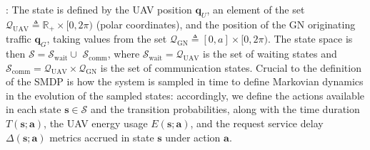 \documentclass[12pt, draftcls, onecolumn]{IEEEtran}
\theoremstyle{plain}
\theoremstyle{definition}
\theoremstyle{remark}
\begin{document}
: The state is defined by the UAV position $\mathbf{q}_{U}$, an element of the set $\mathcal{Q}_{\mathrm{UAV}}{\triangleq}\mathbb{R}_{+}{\times}[0,2\pi)$ (polar coordinates), and the position of the GN originating traffic $\mathbf{q}_G$, taking values from the set  $\mathcal{Q}_{\mathrm{GN}}{\triangleq}[0,a]{\times}[0,2\pi)$. The state space is then $\mathcal{S}{=}\mathcal{S}_{\mathrm{wait}}{\cup}$ $\mathcal{S}_{\mathrm{comm}}$, where $\mathcal{S}_{\mathrm{wait}}{=}\mathcal{Q}_{\mathrm{UAV}}$ is the set of {waiting} states and $\mathcal{S}_{\mathrm{comm}}{=}\mathcal{Q}_{\mathrm{UAV}}{\times}\mathcal{Q}_{\mathrm{GN}}$ is the set of {communication} states. Crucial to the definition of the SMDP is how the system is sampled in time to define Markovian dynamics in the evolution of the sampled states: accordingly, we define the actions available in each state $\mathbf{s}{\in}\mathcal{S}$ and the transition probabilities, along with the time duration $T(\mathbf{s};\mathbf{a})$, the UAV energy usage $E(\mathbf{s};\mathbf{a})$, and the request service delay $\Delta(\mathbf{s};\mathbf{a})$ metrics accrued in state $\mathbf{s}$ under action $\mathbf{a}$.
\end{document}
